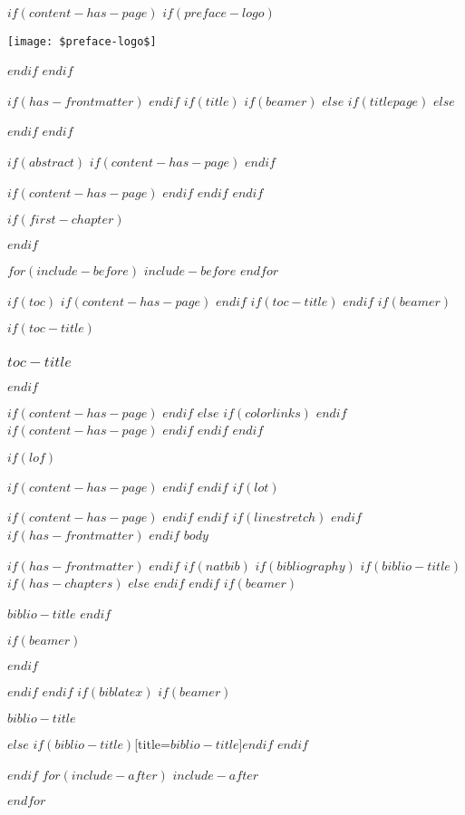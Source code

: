 \documentclass[
$if(fontsize)$
  $fontsize$,
$endif$
$if(lang)$
  $babel-lang$,
$endif$
$if(papersize)$
  $papersize$paper,
$endif$
$if(beamer)$
  ignorenonframetext,
$if(handout)$
  handout,
$endif$
$if(aspectratio)$
  aspectratio=$aspectratio$,
$endif$
$endif$
$for(classoption)$
  $classoption$$sep$,
$endfor$
]{$documentclass$}
\newif\ifbibliography
\begin{document}
$if(content-has-page)$
$if(preface-logo)$
\begin{center}
\texttt{[image: \$preface-logo\$]}
\end{center}
$endif$
$endif$

$if(has-frontmatter)$
\frontmatter
$endif$
$if(title)$
$if(beamer)$
\frame{\titlepage}
$else$
$if(titlepage)$
$else$
\maketitle
$endif$
$endif$


$if(abstract)$
$if(content-has-page)$
\thispagestyle{empty}
$endif$
\begin{abstract}
$abstract$
\end{abstract}
$if(content-has-page)$
\newpage
$endif$
$endif$
$endif$

$if(first-chapter)$
\setcounter{chapter}{$first-chapter$}
\addtocounter{chapter}{-1}
$endif$


$for(include-before)$
$include-before$
$endfor$

$if(toc)$
$if(content-has-page)$
\thispagestyle{empty}
$endif$
$if(toc-title)$
\renewcommand*\contentsname{$toc-title$}
$endif$
$if(beamer)$
\begin{frame}[allowframebreaks]
$if(toc-title)$
  \frametitle{$toc-title$}
$endif$
  \tableofcontents[hideallsubsections]
\end{frame}
$if(content-has-page)$
\newpage
$endif$
$else$
{
$if(colorlinks)$
\hypersetup{linkcolor=$if(toccolor)$$toccolor$$else$$endif$}
$endif$
\setcounter{tocdepth}{$toc-depth$}
\tableofcontents
$if(content-has-page)$
\newpage
$endif$
}
$endif$
$endif$

$if(lof)$
\listoffigures
$if(content-has-page)$
\newpage
$endif$
$endif$
$if(lot)$
\listoftables
$if(content-has-page)$
\newpage
$endif$
$endif$
$if(linestretch)$
$endif$
$if(has-frontmatter)$
\mainmatter
$endif$
$body$

$if(has-frontmatter)$
\backmatter
$endif$
$if(natbib)$
$if(bibliography)$
$if(biblio-title)$
$if(has-chapters)$
\renewcommand\bibname{$biblio-title$}
$else$
\renewcommand\refname{$biblio-title$}
$endif$
$endif$
$if(beamer)$
\begin{frame}[allowframebreaks]{$biblio-title$}
  \bibliographytrue
$endif$
  
$if(beamer)$
\end{frame}
$endif$

$endif$
$endif$
$if(biblatex)$
$if(beamer)$
\begin{frame}[allowframebreaks]{$biblio-title$}
  \bibliographytrue
  \printbibliography[heading=none]
\end{frame}
$else$
\printbibliography$if(biblio-title)$[title=$biblio-title$]$endif$
$endif$

$endif$
$for(include-after)$
$include-after$

$endfor$
\end{document}
